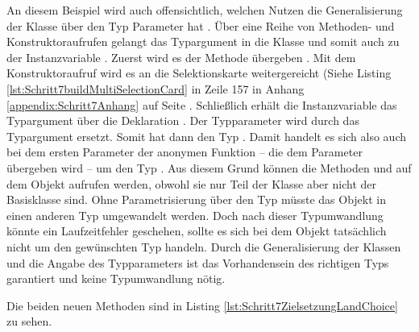 An diesem Beispiel wird auch offensichtlich,
welchen Nutzen die Generalisierung der Klasse  über den Typ Parameter  hat .
Über eine Reihe von Methoden- und Konstruktoraufrufen gelangt das Typargument  in die Klasse  und somit auch zu der Instanzvariable . Zuerst wird es der Methode  übergeben . 
Mit dem Konstruktoraufruf  wird es an die Selektionskarte weitergereicht (Siehe Listing \ref{lst:Schritt7buildMultiSelectionCard} in Zeile 157 in Anhang \ref{appendix:Schritt7Anhang} auf Seite \pageref{lst:Schritt7buildMultiSelectionCard}.
Schließlich erhält die Instanzvariable das Typargument über die Deklaration  . Der Typparameter wird durch das Typargument ersetzt. Somit hat  dann den Typ .
Damit handelt es sich also auch bei dem ersten Parameter  der anonymen Funktion --
die dem Parameter  übergeben wird  -- um den Typ .
Aus diesem Grund können die Methoden   und   auf dem Objekt  aufrufen werden,
obwohl sie nur Teil der Klasse  aber nicht der Basisklasse  sind.
Ohne Parametrisierung über den Typ müsste das Objekt  in einen anderen Typ umgewandelt werden.
Doch nach dieser Typumwandlung könnte ein Laufzeitfehler geschehen, sollte es sich bei dem Objekt tatsächlich nicht um den gewünschten Typ handeln.
Durch die Generalisierung der Klassen und die Angabe des Typparameters ist das Vorhandensein des richtigen Typs garantiert und keine Typumwandlung nötig.

Die beiden neuen Methoden sind in Listing \ref{lst:Schritt7ZielsetzungLandChoice} zu sehen.


